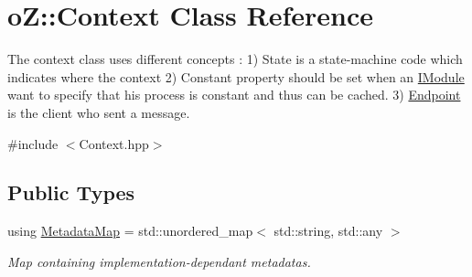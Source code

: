 \hypertarget{classo_z_1_1_context}{}\section{oZ\+::Context Class Reference}
\label{classo_z_1_1_context}


The context class uses different concepts \+: 1) State is a state-\/machine code which indicates where the context 2) Constant property should be set when an \mbox{\hyperlink{classo_z_1_1_i_module}{I\+Module}} want to specify that his process is constant and thus can be cached. 3) \mbox{\hyperlink{classo_z_1_1_endpoint}{Endpoint}} is the client who sent a message.  




{\ttfamily \#include $<$Context.\+hpp$>$}

\subsection*{Public Types}
\begin{DoxyCompactItemize}
\item 
using \mbox{\hyperlink{classo_z_1_1_context_a27f05cdc375f513979a6080896cf9496}{Metadata\+Map}} = std\+::unordered\+\_\+map$<$ std\+::string, std\+::any $>$
\begin{DoxyCompactList}\small\item\em Map containing implementation-\/dependant metadatas. \end{DoxyCompactList}\end{DoxyCompactItemize}
